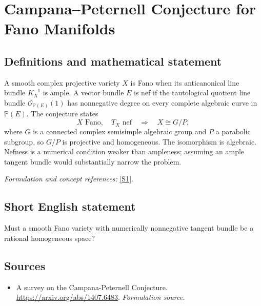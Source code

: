 \documentclass[11pt]{article}
\begin{document}
\section*{\texorpdfstring{Campana–Peternell Conjecture for Fano Manifolds}{Campana–Peternell Conjecture for Fano Manifolds}}\label{30005487}
\subsection{Definitions and mathematical statement}
A smooth complex projective variety $X$ is Fano when its anticanonical line bundle $K_X^{-1}$ is ample. A vector bundle $E$ is nef if the tautological quotient line bundle $\mathcal O_{{\mathbb{P}}(E)}(1)$ has nonnegative degree on every complete algebraic curve in ${\mathbb{P}}(E)$. The conjecture states
\[
 X\text{ Fano},\quad T_X\text{ nef}
 \quad\Longrightarrow\quad X\cong G/P,
\]
where $G$ is a connected complex semisimple algebraic group and $P$ a parabolic subgroup, so $G/P$ is projective and homogeneous. The isomorphism is algebraic. Nefness is a numerical condition weaker than ampleness; assuming an ample tangent bundle would substantially narrow the problem.
\par\smallskip\textit{Formulation and concept references:} \href{https://arxiv.org/abs/1407.6483}{[S1]}.

\subsection{Short English statement}
Must a smooth Fano variety with numerically nonnegative tangent bundle be a rational homogeneous space?
\subsection{Sources}
\begin{itemize}
\item[S1]A survey on the Campana-Peternell Conjecture.
\url{https://arxiv.org/abs/1407.6483}.
\textit{Formulation source.}
\end{itemize}
\end{document}
